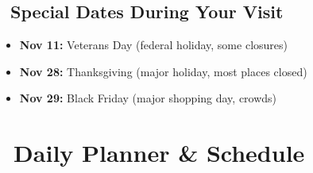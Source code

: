 \documentclass[10pt,letterpaper]{article}
\begin{document}
\subsection*{\faCalendar\ Special Dates During Your Visit}

\begin{small}
\begin{itemize}[leftmargin=0.2in,itemsep=1pt]
\item \textbf{Nov 11:} Veterans Day (federal holiday, some closures)
\item \textbf{Nov 28:} Thanksgiving (major holiday, most places closed)
\item \textbf{Nov 29:} Black Friday (major shopping day, crowds)
\end{itemize}
\end{small}

\newpage


\section*{\faCalendar\ Daily Planner \& Schedule}
\end{document}
